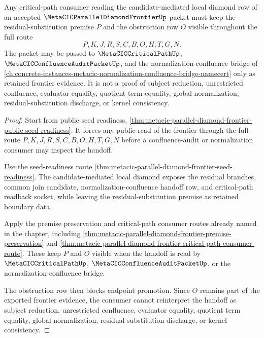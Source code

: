 \begin{theorem}
\label{thm:metacic-parallel-diamond-frontier-critical-path-retained-premise-handoff}
Any critical-path consumer reading the candidate-mediated local diamond row of an accepted $\MetaCICParallelDiamondFrontierUp$ packet must keep the residual-substitution premise $P$ and the obstruction row $O$ visible throughout the full route
$$
P,K,J,R,S,C,B,O,H,T,G,N .
$$
The packet may be passed to $\MetaCICCriticalPathUp$, $\MetaCICConfluenceAuditPacketUp$, and the normalization-confluence bridge of \autoref{ch:concrete-instances-metacic-normalization-confluence-bridge-namecert} only as retained frontier evidence. It is not a proof of subject reduction, unrestricted confluence, evaluator equality, quotient term equality, global normalization, residual-substitution discharge, or kernel consistency.
\end{theorem}
\begin{proof}
Start from public seed readiness, \autoref{thm:metacic-parallel-diamond-frontier-public-seed-readiness}. It forces any public read of the frontier through the full route $P,K,J,R,S,C,B,O,H,T,G,N$ before a confluence-audit or normalization consumer may inspect the handoff.

Use the seed-readiness route \autoref{thm:metacic-parallel-diamond-frontier-seed-readiness}. The candidate-mediated local diamond exposes the residual branches, common join candidate, normalization-confluence handoff row, and critical-path readback socket, while leaving the residual-substitution premise as retained boundary data.

Apply the premise preservation and critical-path consumer routes already named in the chapter, including \autoref{thm:metacic-parallel-diamond-frontier-premise-preservation} and \autoref{thm:metacic-parallel-diamond-frontier-critical-path-consumer-route}. These keep $P$ and $O$ visible when the handoff is read by $\MetaCICCriticalPathUp$, $\MetaCICConfluenceAuditPacketUp$, or the normalization-confluence bridge.

The obstruction row then blocks endpoint promotion. Since $O$ remains part of the exported frontier evidence, the consumer cannot reinterpret the handoff as subject reduction, unrestricted confluence, evaluator equality, quotient term equality, global normalization, residual-substitution discharge, or kernel consistency.
\end{proof}

